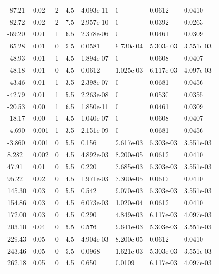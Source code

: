 \documentclass[preview]{standalone}
\begin{document}
{{\begin{tabular}{L{1.2cm}C{1.2cm} C{0.3cm}C{0.5cm} C{1.4cm}C{1.4cm} C{1.4cm}C{1.4cm}}
  -87.21  &  0.02  & 2     & 4.5 &  4.093e-11  & 0  & 0.0612 &  0.0410   \\ 
  -82.72  &  0.02  & 2     & 7.5 &  2.957e-10  & 0  & 0.0392 &  0.0263   \\ 
  -69.20  &  0.01  & 1     & 6.5 &  2.378e-06  & 0  & 0.0461 &  0.0309   \\ 
  -65.28  &  0.01  & 0     & 5.5 &  0.0581  & 9.730e-04  & 5.303e-03 &  3.551e-03   \\ 
  -48.93  &  0.01  & 1     & 4.5 &  1.894e-07  & 0  & 0.0608 &  0.0407   \\ 
  -48.18  &  0.01  & 0     & 4.5 &  0.0612  & 1.025e-03  & 6.117e-03 &  4.097e-03   \\ 
  -43.46  &  0.01  & 1     & 3.5 &  2.398e-07  & 0  & 0.0681 &  0.0456   \\ 
  -42.79  &  0.01  & 1     & 5.5 &  2.263e-08  & 0  & 0.0530 &  0.0355   \\ 
  -20.53  &  0.00  & 1     & 6.5 &  1.850e-11  & 0  & 0.0461 &  0.0309   \\ 
  -18.17  &  0.00  & 1     & 4.5 &  1.040e-07  & 0  & 0.0608 &  0.0407   \\ 
  -4.690  &  0.001  & 1     & 3.5 &  2.151e-09  & 0  & 0.0681 &  0.0456   \\ 
  -3.860  &  0.001  & 0     & 5.5 &  0.156  & 2.617e-03  & 5.303e-03 &  3.551e-03   \\ 
  8.282  &  0.002  & 0     & 4.5 &  4.892e-03  & 8.200e-05  & 0.0612 &  0.0410   \\ 
  47.91  &  0.01  & 0     & 5.5 &  0.220  & 3.685e-03  & 5.303e-03 &  3.551e-03   \\ 
  95.22  &  0.02  & 0     & 4.5 &  1.971e-03  & 3.300e-05  & 0.0612 &  0.0410   \\ 
  145.30  &  0.03  & 0     & 5.5 &  0.542  & 9.070e-03  & 5.303e-03 &  3.551e-03   \\ 
  154.86  &  0.03  & 0     & 4.5 &  6.073e-03  & 1.020e-04  & 0.0612 &  0.0410   \\ 
  172.00  &  0.03  & 0     & 4.5 &  0.290  & 4.849e-03  & 6.117e-03 &  4.097e-03   \\ 
  203.10  &  0.04  & 0     & 5.5 &  0.576  & 9.641e-03  & 5.303e-03 &  3.551e-03   \\ 
  229.43  &  0.05  & 0     & 4.5 &  4.904e-03  & 8.200e-05  & 0.0612 &  0.0410   \\ 
  243.46  &  0.05  & 0     & 5.5 &  0.0968  & 1.621e-03  & 5.303e-03 &  3.551e-03   \\ 
  262.18  &  0.05  & 0     & 4.5 &  0.650  & 0.0109  & 6.117e-03 &  4.097e-03   \\ 

\end{tabular}}}
\end{document}
